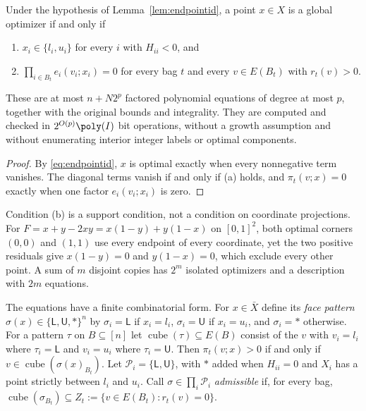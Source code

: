 \begin{theorem}\label{thm:endpointset}
Under the hypothesis of Lemma~\ref{lem:endpointid}, a point $x\in X$ is a
global optimizer if and only if
\begin{enumerate}
\item[(a)] $x_i\in\{l_i,u_i\}$ for every $i$ with $H_{ii}<0$, and
\item[(b)] $\prod_{i\in B_t}e_i(v_i;x_i)=0$ for every bag $t$ and every
$v\in E(B_t)$ with $r_t(v)>0$.
\end{enumerate}
These are at most $n+N2^p$ factored polynomial equations of degree at most
$p$, together with the original bounds and integrality. They are computed and
checked in $2^{O(p)}\poly(I)$ bit operations, without a growth assumption and
without enumerating interior integer labels or optimal components.
\end{theorem}

\begin{proof}
By \eqref{eq:endpointid}, $x$ is optimal exactly when every nonnegative term
vanishes. The diagonal terms vanish if and only if (a) holds, and
$\pi_t(v;x)=0$ exactly when one factor $e_i(v_i;x_i)$ is zero.
\end{proof}

Condition (b) is a support condition, not a condition on coordinate
projections. For $F=x+y-2xy=x(1-y)+y(1-x)$ on $[0,1]^2$, both optimal
corners $(0,0)$ and $(1,1)$ use every endpoint of every coordinate, yet the
two positive residuals give $x(1-y)=0$ and $y(1-x)=0$, which exclude every
other point. A sum of $m$ disjoint copies has $2^m$ isolated optimizers and
a description with $2m$ equations.

The equations have a finite combinatorial form. For $x\in\bar X$ define its
\emph{face pattern} $\sigma(x)\in\{\mathsf L,\mathsf U,\ast\}^n$ by
$\sigma_i=\mathsf L$ if $x_i=l_i$, $\sigma_i=\mathsf U$ if $x_i=u_i$, and
$\sigma_i=\ast$ otherwise. For a pattern $\tau$ on $B\subseteq[n]$ let
$\operatorname{cube}(\tau)\subseteq E(B)$ consist of the $v$ with $v_i=l_i$
where $\tau_i=\mathsf L$ and $v_i=u_i$ where $\tau_i=\mathsf U$. Then
$\pi_t(v;x)>0$ if and only if $v\in\operatorname{cube}(\sigma(x)_{B_t})$.
Let $\mathcal P_i=\{\mathsf L,\mathsf U\}$, with $\ast$ added when $H_{ii}=0$
and $X_i$ has a point strictly between $l_i$ and $u_i$. Call
$\sigma\in\prod_i\mathcal P_i$ \emph{admissible} if, for every bag,
$\operatorname{cube}(\sigma_{B_t})\subseteq Z_t:=\{v\in E(B_t):r_t(v)=0\}$.

